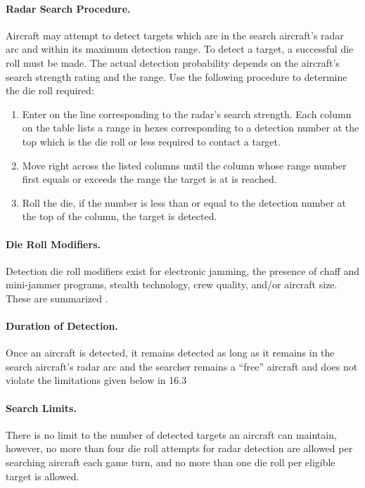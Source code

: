 \paragraph{Radar Search Procedure.} Aircraft may attempt to detect targets which are in the search aircraft's radar arc and within its maximum detection range. To detect a target, a successful die roll must be made. The actual detection probability depends on the aircraft's search strength rating and the range. Use the following procedure to determine the die roll required:


\begin{enumerate}
    \item Enter  on the line corresponding to the radar's search strength. Each column on the table lists a range in hexes corresponding to a detection number at the top which is the die roll or less required to contact a target.
    \item Move right across the listed columns until the column whose range number first equals or exceeds the range the target is at is reached.
    \item Roll the die, if the number is less than or equal to the detection number at the top of the column, the target is detected.
\end{enumerate}

\paragraph{Die Roll Modifiers.} Detection die roll modifiers exist for electronic jamming, the presence of chaff and mini-jammer programs, stealth technology, crew quality, and/or aircraft size. These are summarized .

\paragraph{Duration of Detection.} Once an aircraft is detected, it remains detected as long as it remains in the search aircraft's radar arc and the searcher remains a “free” aircraft and does not violate the limitations given below in 16.3

\paragraph{Search Limits.} There is no limit to the number of detected targets an aircraft can maintain, however, no more than four die roll attempts for radar detection are allowed per searching aircraft each game turn, and no more than one die roll per eligible target is allowed.


